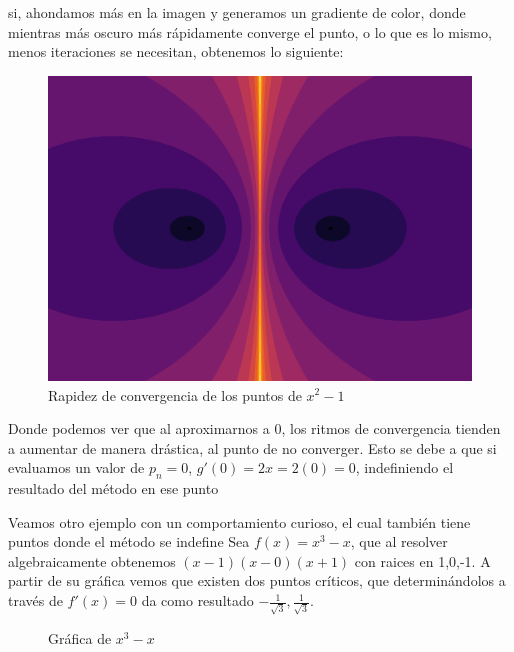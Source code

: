 si, ahondamos más en la imagen y generamos un gradiente de color, donde mientras más oscuro más rápidamente converge el punto, o lo que es lo mismo, menos iteraciones se necesitan, obtenemos lo siguiente:
\begin{figure}[H]
    \centering
    \includegraphics[scale=0.26]{images/eq1-2.png}
    \caption{Rapidez de convergencia de los puntos de $x^2-1$}
    \label{fig:eq_cuadratica_2}
\end{figure}


Donde podemos ver que al aproximarnos a 0, los ritmos de convergencia tienden a aumentar de manera drástica, al punto de no converger.
Esto se debe a que si evaluamos un valor de $p_n = 0$, $g'(0) = 2x = 2(0) = 0$, indefiniendo el resultado del método en ese punto

Veamos otro ejemplo con un comportamiento curioso, el cual también tiene puntos donde el método se indefine
Sea $f(x) = x^3-x$, que al resolver algebraicamente obtenemos $(x-1)(x-0)(x+1)$ con raices en 1,0,-1.
A partir de su gráfica vemos que existen dos puntos críticos, que determinándolos a través de $f'(x) = 0$ da como resultado $-\frac{1}{\sqrt{3}}, \frac{1}{\sqrt{3}}$. 

\begin{figure}[h]
\centering
    \caption{Gráfica de $x^3-x$}
    \label{fig:graph_cubica}
\end{figure}


